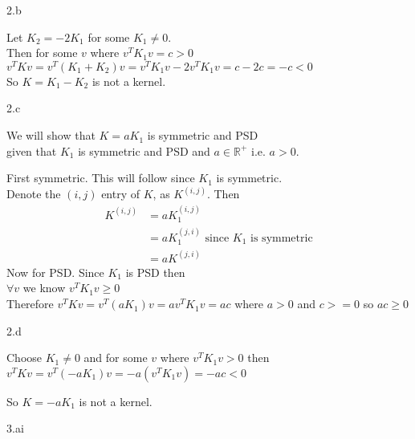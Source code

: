 \LARGE
2.b
\normalsize

  \begin{answer}
  Let $K_2 = -2K_1$ for some $K_1 \ne 0$. \\
  Then for some $v$ where $v^T K_1 v = c > 0$ \\
  $v^T K v = v^T(K_1 + K_2)v = v^TK_1v -2 v^T K_1 v = c - 2c = -c < 0$\\
  So $K = K_1 - K_2$ is not a kernel.
  \end{answer}
\clearpage

\LARGE
2.c
\normalsize

  \begin{answer}
  We will show that $K = a K_1$ is symmetric and PSD \\
  given that $K_1$ is symmetric and PSD and $a \in \mathbb{R}^+$ i.e. $a >0$.
  
  First symmetric.  This will follow since $K_1$ is symmetric.\\
  Denote the $(i,j)$ entry of $K$, as $K^{(i,j)}$. Then
  \begin{align*}
  K^{(i,j)} &= a K_1^{(i,j)}  \\
            &= a K_1^{(j,i)}  \text{  since $K_1$ is symmetric}\\
            &= a K^{(j,i)}
    \end{align*}
    Now for PSD. Since $K_1$ is PSD then \\
    $\forall v$ we know $ v^TK_1v \ge 0$ \\
    Therefore $v^T K v = v^T(a K_1)v = a v^TK_1v = a c$ where $a>0$ and $c>= 0$ so $ac \ge 0$
 
  \end{answer}
\clearpage

\LARGE
2.d
\normalsize

  \begin{answer}
  Choose $K_1 \ne 0$ and for some $v$ where $v^T K_1v > 0$
  then \\
  $v^T K v = v^T (-a K_1) v = -a (v^T K_1 v) =  -a c < 0$

  So $K = -a  K_1$ is not a kernel.
  \end{answer}
\clearpage

\LARGE
3.ai
\normalsize

